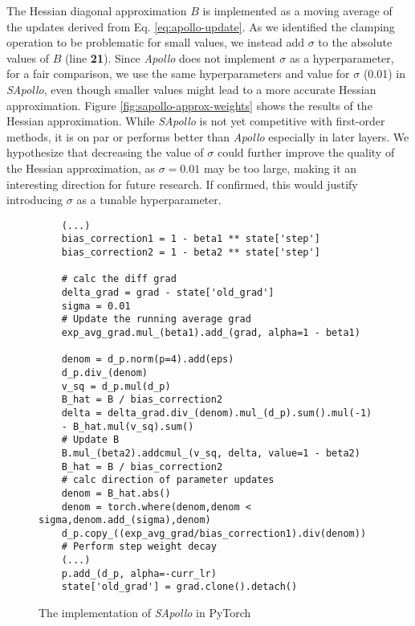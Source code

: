     The Hessian diagonal approximation $B$ is implemented as a moving average of the updates derived from Eq. \ref{eq:apollo-update}.
    As we identified the clamping operation to be problematic for small values, we instead add $\sigma$ to the absolute values of $B$ (line \textbf{21}).
    Since \emph{Apollo} does not implement $\sigma$ as a hyperparameter, for a fair comparison, we use the same hyperparameters and  value for $\sigma$ (0.01) in \emph{SApollo}, even though smaller values might lead to a more accurate Hessian approximation.
    Figure \ref{fig:sapollo-approx-weights} shows the results of the Hessian approximation. 
    While \emph{SApollo} is not yet competitive with first-order methods, it is on par or performs better than \emph{Apollo} especially in later layers.
    We hypothesize that decreasing the value of $\sigma$ could further improve the quality of the Hessian approximation, as $\sigma=0.01$ may be too large,
    making it an interesting direction for future research.
    If confirmed, this would justify introducing $\sigma$ as a tunable hyperparameter.

    \begin{figure}[H]
     \begin{verbatim}
    (...)
    bias_correction1 = 1 - beta1 ** state['step']
    bias_correction2 = 1 - beta2 ** state['step']

    # calc the diff grad
    delta_grad = grad - state['old_grad']
    sigma = 0.01
    # Update the running average grad
    exp_avg_grad.mul_(beta1).add_(grad, alpha=1 - beta1)

    denom = d_p.norm(p=4).add(eps)
    d_p.div_(denom)
    v_sq = d_p.mul(d_p)
    B_hat = B / bias_correction2
    delta = delta_grad.div_(denom).mul_(d_p).sum().mul(-1) 
    - B_hat.mul(v_sq).sum()
    # Update B
    B.mul_(beta2).addcmul_(v_sq, delta, value=1 - beta2)
    B_hat = B / bias_correction2
    # calc direction of parameter updates
    denom = B_hat.abs()
    denom = torch.where(denom,denom < sigma,denom.add_(sigma),denom)
    d_p.copy_((exp_avg_grad/bias_correction1).div(denom))
    # Perform step weight decay
    (...)
    p.add_(d_p, alpha=-curr_lr)
    state['old_grad'] = grad.clone().detach()
    \end{verbatim}
        \caption{The implementation of \emph{SApollo} in PyTorch}
        \label{fig:sapollo_imp}
    
        \end{figure}
    

